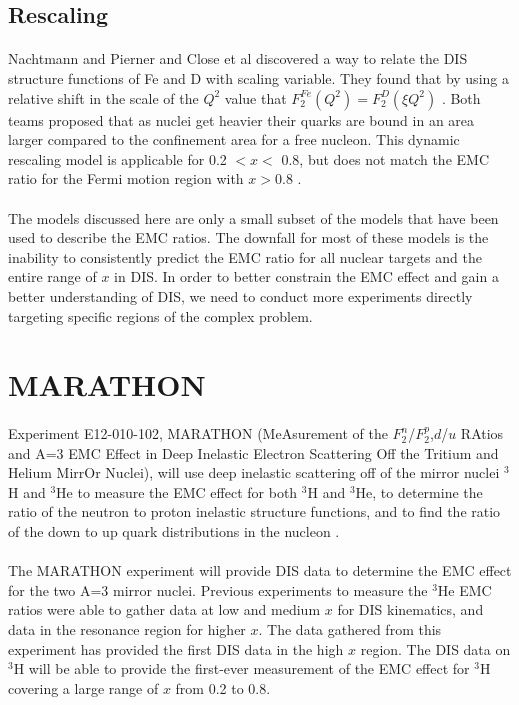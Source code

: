 \subsection{Rescaling}
\paragraph{} Nachtmann and Pierner \cite{EMC_rescaling_2} and Close et al \cite{EMC_rescaling_1} discovered a way to relate the DIS structure functions of Fe and D with scaling variable. They found that by using a relative shift in the scale of the $Q^2$ value that $F_2^{Fe}(Q^2) =F_2^{D}(\xi Q^2)$ \cite{Geesaman}. Both teams proposed that as nuclei get heavier their quarks are bound in an area larger compared to the confinement area for a free nucleon. This dynamic rescaling model is applicable for 0.2 $ < x <$ 0.8, but does not match the EMC ratio for the Fermi motion region with $x > 0.8$ \cite{EMC_model_1, EMC_rescaling_1, Geesaman, EMC_rescaling_2}.

\paragraph{} The models discussed here are only a small subset of the models that have been used to describe the EMC ratios. The downfall for most of these models is the inability to consistently predict the EMC ratio for all nuclear targets and the entire range of $x$ in DIS. In order to better constrain the EMC effect and gain a better understanding of DIS, we need to conduct more experiments directly targeting specific regions of the complex problem.  

\section{MARATHON}
\paragraph{}Experiment E12-010-102, MARATHON (MeAsurement of the $F_2^n$/$F_2^p$,$d$/$u$ RAtios and A=3 EMC Effect in Deep Inelastic Electron Scattering Off the Tritium and Helium MirrOr Nuclei), will use deep inelastic scattering off of the mirror nuclei $^3$H and $^3$He to measure the EMC effect for both $^3$H and $^3$He, to determine the ratio of the neutron to proton inelastic structure functions, and to find the ratio of the down to up quark distributions in the nucleon \cite{Marathon}. 
\paragraph{}The MARATHON experiment will provide DIS data to determine the EMC effect for the two A=3 mirror nuclei. Previous experiments to measure the $^3$He EMC ratios were able to gather data at low and medium $x$ for DIS kinematics, and data in the resonance region for higher $x$. The data gathered from this experiment has provided the first DIS data in the high $x$ region. The DIS data on $^3$H will be able to provide the first-ever measurement of the EMC effect for $^3$H covering a large range of $x$ from 0.2 to 0.8.
